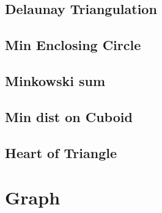 \documentclass[a4paper,10pt,twocolumn,oneside]{article}
\begin{document}
\subsection{Delaunay Triangulation}


\subsection{Min Enclosing Circle}


%

%

\subsection{Minkowski sum}


% 

%

\subsection{Min dist on Cuboid}


\subsection{Heart of Triangle}


\section{Graph}
\end{document}
